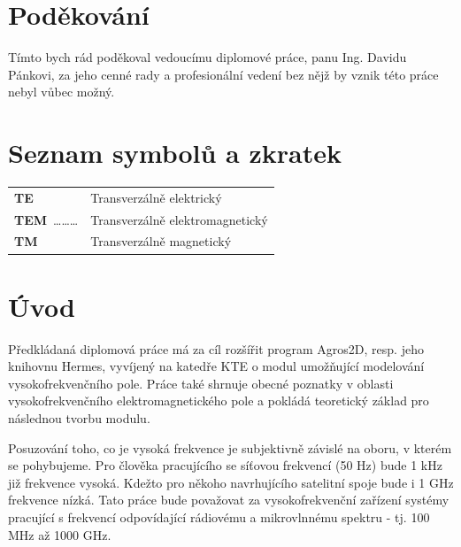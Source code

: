 \documentclass[12pt,a4paper,oneside]{article}
\numberwithin{equation}{section} %
\numberwithin{figure}{section} %
\numberwithin{table}{section} %
\begin{document}
\vspace*{50mm}
\section*{Poděkování}
Tímto bych rád poděkoval vedoucímu diplomové práce, panu Ing. Davidu Pánkovi, za 			jeho cenné rady a profesionální vedení bez nějž by vznik této práce nebyl vůbec 			možný.\\
\newpage


\cfoot{-~\thepage ~-}
\pagestyle{fancy}
\setcounter{page}{1}


\setlength{\parskip}{0ex} %
\tableofcontents
\newpage


\section*{Seznam symbolů a zkratek}

\begin{tabular}{ll}
\textbf{TE}\dotfill & Transverzálně elektrický \\  
\textbf{TEM}~\ldots\ldots\ldots & Transverzálně elektromagnetický \\ 
\textbf{TM}\dotfill & Transverzálně magnetický \\ 
\end{tabular} 
\newpage

\setlength{\parindent}{5ex} 
\setlength{\parskip}{1ex}


\section{Úvod}
Předkládaná diplomová práce má za cíl rozšířit program Agros2D, resp. jeho knihovnu Hermes, vyvíjený na katedře KTE o modul umožňující modelování vysokofrekvenčního pole. Práce také shrnuje obecné poznatky v oblasti vysokofrekvenčního elektromagnetického pole a pokládá teoretický základ pro následnou tvorbu modulu.

Posuzování toho, co je vysoká frekvence je subjektivně závislé na oboru, v kterém se pohybujeme. Pro člověka pracujícího se síťovou frekvencí (50 Hz) bude 1 kHz již frekvence vysoká. Kdežto pro někoho navrhujícího satelitní spoje bude i 1 GHz frekvence nízká. Tato práce bude považovat za vysokofrekvenční zařízení systémy pracující s frekvencí odpovídající rádiovému a mikrovlnnému spektru - tj. 100 MHz až 1000 GHz. \cite{Pozar4}
\end{document}
